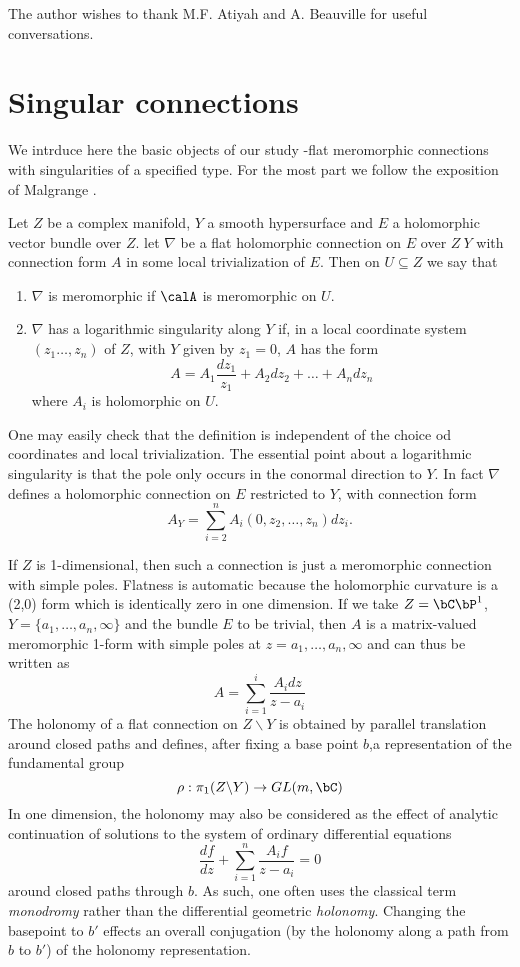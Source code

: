 The author wishes to thank M.F. Atiyah and A. Beauville for useful conversations.

\section{Singular connections}\label{art7-sec-2}  
We intrduce here the basic objects of our study -flat meromorphic connections with singularities of a specified type. For the most part we follow the exposition of Malgrange \cite{art7-key10}.

\begin{defini}\label{art7-definition-1}
Let $Z$ be a complex manifold, $Y$ a smooth hypersurface and $E$ a holomorphic vector bundle over $Z$. let $\nabla$ be a flat holomorphic connection on $E$ over $Z \ Y$ with connection form $A$ in some local trivialization of $E$. Then on $U\subseteq Z$ we say that
\begin{enumerate}[(1)]
\item $\nabla$ is meromorphic if $\calA$ is meromorphic on $U$.

\item $\nabla$ has a logarithmic singularity along $Y$ if, in a local coordinate system $(z_{1}\ldots, z_{n})$ of $Z$, with $Y$ given by $z_{1} = 0$, $A$ has the form
$$
A = A_{1}\dfrac{dz_{1}}{z_{1}} + A_{2}dz_{2} + \ldots + A_{n}dz_{n}
$$
where $A_{i}$ is holomorphic on $U$.
\end{enumerate}
\end{defini}

One may easily check that the definition is independent of the choice od coordinates and local trivialization. The essential point about a logarithmic singularity is that the pole only occurs in the conormal direction to $Y$. In fact $\nabla$ defines a holomorphic connection on $E$ restricted to $Y$, with connection form
$$
A_{Y} = \sum\limits_{i=2}^{n}A_{i}(0, z_{2}, \ldots, z_{n})dz_{i}.
$$

If $Z$ is 1-dimensional, then such a connection is just a meromorphic connection with simple poles. Flatness is automatic because the holomorphic curvature is a (2,0) form which is identically zero in one dimension. If we take $Z=\bC\bP^{1}$, $Y = \{a_{1}, \ldots, a_{n}, \infty\}$ and the bundle $E$ to be trivial, then $A$ is a matrix-valued meromorphic 1-form with simple poles at $z=a_{1},\ldots, a_{n}, \infty$ and can thus be written as
$$
A = \sum\limits_{i =1}^{i}\dfrac{A_{i}dz}{z-a_{i}}
$$
The holonomy of a flat connection on $Z\backslash Y$ is obtained by parallel translation around closed paths and defines, after fixing a base point $b$,a representation of the fundamental group
$$
\rho : \pi_{1}(Z\backslash Y) \rightarrow GL(m ,\bC)
$$
In one dimension, the holonomy may also be considered as the effect of analytic continuation of solutions to the system of ordinary differential equations
$$
\dfrac{df}{dz} + \sum\limits_{i=1}^{n} \dfrac{A_{i}f}{z-a_{i}} = 0
$$
around closed paths through $b$. As such, one often uses the classical term \textit{monodromy} rather than the differential geometric \textit{holonomy}. Changing the basepoint to $b'$ effects an overall conjugation (by the holonomy along a path from $b$ to $b'$) of the holonomy representation.

